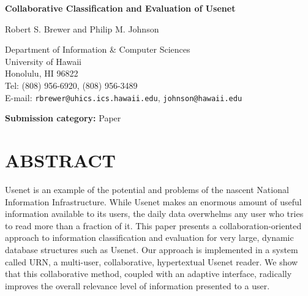 

\vspace*{1in}
\pagestyle{empty}

\begin{center}
  
{\Large\bf Collaborative Classification and Evaluation of Usenet}

        \bigskip
                     
         Robert S. Brewer and Philip M. Johnson \bigskip

         Department of Information \& Computer Sciences\\
         University of Hawaii\\
         Honolulu, HI 96822\\
         Tel: (808) 956-6920, (808) 956-3489\\
         E-mail: {\tt rbrewer@uhics.ics.hawaii.edu}, {\tt johnson@hawaii.edu}
         
         \bigskip

 {\bf Submission category:} Paper      \bigskip\par         

         \bigskip
\end{center}

\section* {ABSTRACT}

Usenet is an example of the potential and problems of the nascent National
Information Infrastructure. While Usenet makes an enormous amount of useful
information available to its users, the daily data overwhelms any user who
tries to read more than a fraction of it. This paper presents a
collaboration-oriented approach to information classification and evaluation
for very large, dynamic database structures such as Usenet. Our approach is
implemented in a system called URN, a multi-user, collaborative, hypertextual
Usenet reader.  We show that this collaborative method, coupled with an
adaptive interface, radically improves the overall relevance level of
information presented to a user.


